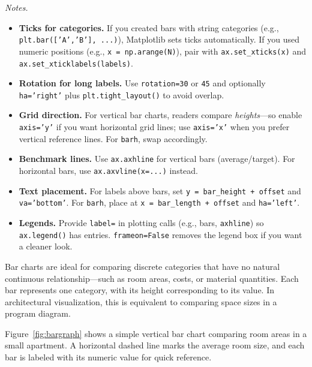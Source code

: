 \textit{Notes.}
\begin{itemize}
    \item \textbf{Ticks for categories.} If you created bars with string categories (e.g., \texttt{plt.bar(['A','B'], ...)}), Matplotlib sets ticks automatically. If you used numeric positions (e.g., \texttt{x = np.arange(N)}), pair with \texttt{ax.set\_xticks(x)} and \texttt{ax.set\_xticklabels(labels)}.
    \item \textbf{Rotation for long labels.} Use \texttt{rotation=30} or \texttt{45} and optionally \texttt{ha='right'} plus \texttt{plt.tight\_layout()} to avoid overlap.
    \item \textbf{Grid direction.} For vertical bar charts, readers compare \emph{heights}—so enable \texttt{axis='y'} if you want horizontal grid lines; use \texttt{axis='x'} when you prefer vertical reference lines. For \texttt{barh}, swap accordingly.
    \item \textbf{Benchmark lines.} Use \texttt{ax.axhline} for vertical bars (average/target). For horizontal bars, use \texttt{ax.axvline(x=...)} instead.
    \item \textbf{Text placement.} For labels above bars, set \texttt{y = bar\_height + offset} and \texttt{va='bottom'}. For \texttt{barh}, place at \texttt{x = bar\_length + offset} and \texttt{ha='left'}.
    \item \textbf{Legends.} Provide \texttt{label=} in plotting calls (e.g., bars, \texttt{axhline}) so \texttt{ax.legend()} has entries. \texttt{frameon=False} removes the legend box if you want a cleaner look.
\end{itemize}



Bar charts are ideal for comparing discrete categories that have no natural continuous relationship—such as room areas, costs, or material quantities. Each bar represents one category, with its height corresponding to its value. In architectural visualization, this is equivalent to comparing space sizes in a program diagram.  

{Figure~\ref{fig:bargraph}} shows a simple vertical bar chart comparing room areas in a small apartment. A horizontal dashed line marks the average room size, and each bar is labeled with its numeric value for quick reference.

